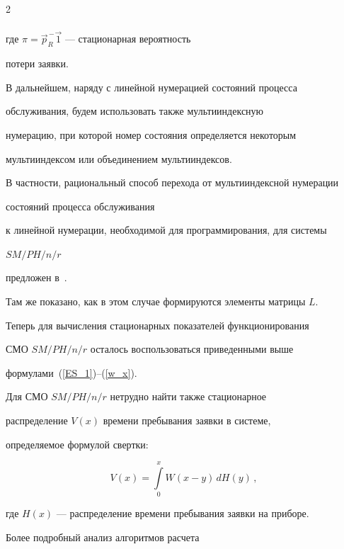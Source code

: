 \begin{multicols}{2}
\begin{multline}
\end{multline}


где $\pi =\vec p^{\,-}_{R} {\vec 1}$ --- стационарная вероятность


потери заявки.





В дальнейшем, наряду с линейной нумерацией состояний процесса


обслуживания, будем использовать также мультииндексную


нумерацию, при которой номер состояния определяется некоторым


мультииндексом или объединением мультииндексов.


В частности, рациональный способ перехода от мультииндексной нумерации


со\-сто\-яний процесса обслуживания


к линейной нумерации, необходимой для программирования, для сис\-те\-мы


$SM/PH/n/r$


предложен в~\cite{PCh03}.


Там же показано, как в этом случае формируются элементы матрицы $L$.


Теперь для вычисления стационарных показателей функционирования


СМО $SM/PH/n/r$ осталось воспользоваться приведенными выше


формулами~(\ref{ES_1})--(\ref{w_x}).





Для СМО $SM/PH/n/r$ нетрудно найти также стационарное


распределение $V(x)$ времени пребывания заявки в системе,


определяемое формулой свертки:


\begin{equation}


\label{v_x}


V(x) =


\int\limits_0^x


W(x-y)\, dH(y)\,,


\end{equation}


где $H(x)$ --- распределение времени пребывания заявки на приборе.





Более подробный анализ алгоритмов расчета



\end{multicols}
